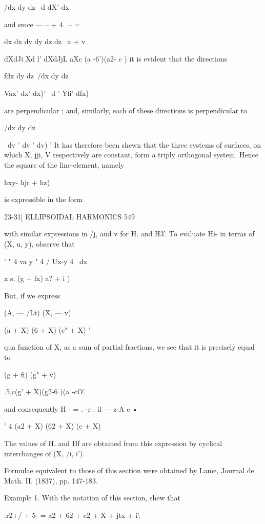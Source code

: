 {{/dx dy dz 
\ d  dX' dx 



and smce — -- +  4.\ -- =   %



dx dx dy dy dz dz \    a + v 

dXdJi Xd l'  dXdJjL  aXc (a -6')(a2- c ) 
it is evident that the directions 

fdx dy dz\ /dx dy dz\ 

Vax' dx' dx)' \ d ' Yfi' dfx) 

are perpendicular ; and, similarly, each of these directions is perpendicular to 

/dx dy dz\ 

\ dv ' dv ' dv) ' 
It has therefore been shewn that the three systems of surfaces, on which 
X, jji, V respectively are constant, form a triply orthogonal system. 
Hence the square of the line-element, namely 

 hxy-  hjr +  hz)\ 

is expressible in the form 



23-31] ELLIPSOIDAL HARMONICS 549 

with similar expressions in /j, and v for H.  and H3'. 
To evaluate Hi- in terras of (X,  u, y), observe that 

' " 4  va y "  4 /  Ux-y   4  \ dx 

 x s; (g  + fx)  a? + i ) 

But, if we express 

(A, — /Lt) (X, — v) 



(a  + X) (6  + X) (c" + X) ' 

qua function of X, as a sum of partial fractions, we see that it is precisely 
equal to 

  (g  + fi) (g" + v) 

 .5,c(g' + X)(g2-6 )(a -cO'. 

and consequently H - = . -r    . il — z-A c • 

  ' 4 (a2 + X) (62 + X) (c  + X) 

The values of H.  and Hf are obtained from this expression by cyclical 
interchanges of (X, /i, i'). 

Formulae equivalent to those of this section were obtained by Lame, Journal de Math. 
II. (1837), pp. 147-183. 

Example 1. With the notation of this section, shew that 

.r2+/ + 5- = a2 + 62 + c2 + X + jtx + i'. 

}}
